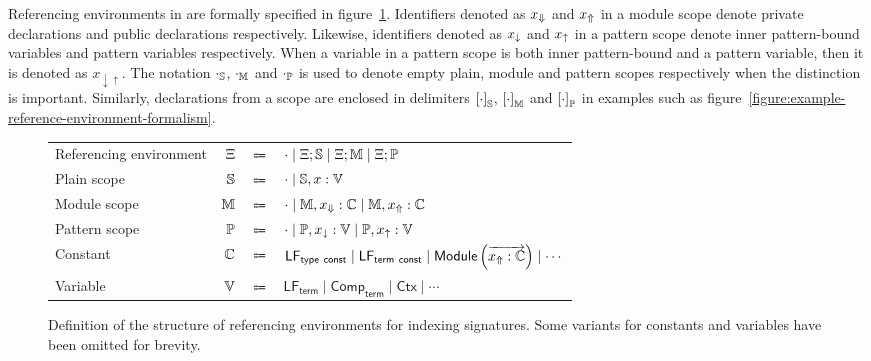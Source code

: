 Referencing environments in \Beluga are formally specified in figure~\ref{figure:referencing-environment-definition}.
Identifiers denoted as $x_\Downarrow$ and $x_\Uparrow$ in a module scope denote private declarations and public declarations respectively.
Likewise, identifiers denoted as $x_\downarrow$ and $x_\uparrow$ in a pattern scope denote inner pattern-bound variables and pattern variables respectively.
When a variable in a pattern scope is both inner pattern-bound and a pattern variable, then it is denoted as $x_{\downarrow\uparrow}$.
The notation $\cdot_{\mathbb{S}}$, $\cdot_{\mathbb{M}}$ and $\cdot_{\mathbb{P}}$ is used to denote empty plain, module and pattern scopes respectively when the distinction is important.
Similarly, declarations from a scope are enclosed in delimiters $\left[\cdot\right]_{\mathbb{S}}$, $\left[\cdot\right]_{\mathbb{M}}$ and $\left[\cdot\right]_{\mathbb{P}}$ in examples such as figure~\ref{figure:example-reference-environment-formalism}.

\begin{figure}[htb]
\centering
\begin{tabular}{lrcl}
Referencing environment & $\Xi$ & $\Coloneqq$ & $\cdot \mid \Xi; \mathbb{S} \mid \Xi; \mathbb{M} \mid \Xi; \mathbb{P}$\\
Plain scope & $\mathbb{S}$ & $\Coloneqq$ & $\cdot \mid \mathbb{S}, x : \mathbb{V}$\\
Module scope & $\mathbb{M}$ & $\Coloneqq$ & $\cdot \mid \mathbb{M}, x_\Downarrow : \mathbb{C} \mid \mathbb{M}, x_\Uparrow : \mathbb{C}$\\
Pattern scope & $\mathbb{P}$ & $\Coloneqq$ & $\cdot \mid \mathbb{P}, x_\downarrow : \mathbb{V} \mid \mathbb{P}, x_\uparrow : \mathbb{V}$\\
Constant & $ \mathbb{C} $ & $ \Coloneqq $ & $\mathsf{LF}_{\mathsf{type\ const}} \mid \mathsf{LF}_{\mathsf{term\ const}} \mid \mathsf{Module}\left(\overrightarrow{x_\Uparrow : \mathbb{C}}\right) \mid \cdots$\\
Variable & $ \mathbb{V} $ & $ \Coloneqq $ & $ \mathsf{LF}_{\mathsf{term}} \mid \mathsf{Comp}_{\mathsf{term}} \mid \mathsf{Ctx} \mid \cdots $
\end{tabular}
\caption[Definition of referencing environments for indexing \Beluga signatures]{%
Definition of the structure of referencing environments for indexing \Beluga signatures.
Some variants for constants and variables have been omitted for brevity.
}
\label{figure:referencing-environment-definition}
\end{figure}

